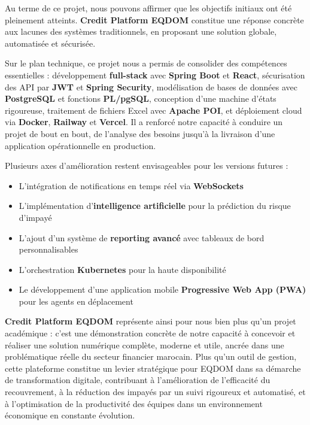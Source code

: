 Au terme de ce projet, nous pouvons affirmer que les objectifs initiaux ont été pleinement atteints. \textbf{Credit Platform EQDOM} constitue une réponse concrète aux lacunes des systèmes traditionnels, en proposant une solution globale, automatisée et sécurisée.

Sur le plan technique, ce projet nous a permis de consolider des compétences essentielles : développement \textbf{full-stack} avec \textbf{Spring Boot} et \textbf{React}, sécurisation des API par \textbf{JWT} et \textbf{Spring Security}, modélisation de bases de données avec \textbf{PostgreSQL} et fonctions \textbf{PL/pgSQL}, conception d'une machine d'états rigoureuse, traitement de fichiers Excel avec \textbf{Apache POI}, et déploiement cloud via \textbf{Docker}, \textbf{Railway} et \textbf{Vercel}. Il a renforcé notre capacité à conduire un projet de bout en bout, de l'analyse des besoins jusqu'à la livraison d'une application opérationnelle en production.

Plusieurs axes d'amélioration restent envisageables pour les versions futures :

\begin{itemize}
    \item L'intégration de notifications en temps réel via \textbf{WebSockets}
    \item L'implémentation d'\textbf{intelligence artificielle} pour la prédiction du risque d'impayé
    \item L'ajout d'un système de \textbf{reporting avancé} avec tableaux de bord personnalisables
    \item L'orchestration \textbf{Kubernetes} pour la haute disponibilité
    \item Le développement d'une application mobile \textbf{Progressive Web App (PWA)} pour les agents en déplacement
\end{itemize}

\textbf{Credit Platform EQDOM} représente ainsi pour nous bien plus qu'un projet académique : c'est une démonstration concrète de notre capacité à concevoir et réaliser une solution numérique complète, moderne et utile, ancrée dans une problématique réelle du secteur financier marocain. Plus qu'un outil de gestion, cette plateforme constitue un levier stratégique pour EQDOM dans sa démarche de transformation digitale, contribuant à l'amélioration de l'efficacité du recouvrement, à la réduction des impayés par un suivi rigoureux et automatisé, et à l'optimisation de la productivité des équipes dans un environnement économique en constante évolution.
